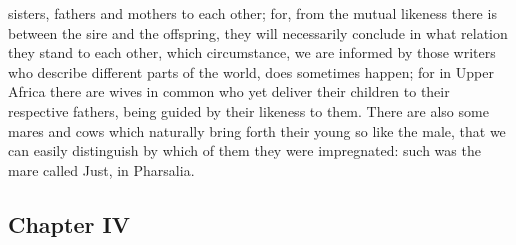 \documentclass[12pt]{article}
\begin{document}
sisters, fathers and mothers to each other; for, from the mutual likeness there is between the sire and the offspring, they will necessarily conclude in what relation they stand to each other, which circumstance, we are informed by those writers who describe different parts of the world, does sometimes happen; for in Upper Africa there are wives in common who yet deliver their children to their respective fathers, being guided by their likeness to them. There are also some mares and cows which naturally bring forth their young so like the male, that we can easily distinguish by which of them they were impregnated: such was the mare called Just, in Pharsalia.

\subsection*{Chapter IV}
\end{document}
